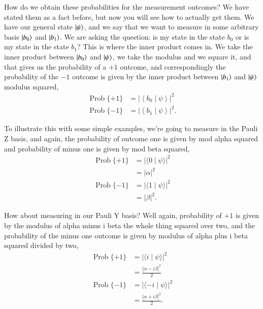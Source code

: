 How do we obtain these probabilities for the measurement outcomes? We have stated them as a fact before, but now you will see how to actually get them. We have our general state $\ket{\psi}$, and we say that we want to measure in some arbitrary basis $\ket{b_0}$ and $\ket{b_1}$. We are asking the question: is my state in the state $b_0$ or is my state in the state $b_1$? This is where the inner product comes in. We take the inner product between $\ket{b_0}$ and $\ket{\psi}$, we take the modulus and we square it, and that gives us the probability of a $+1$ outcome, and correspondingly the probability of the $-1$ outcome is given by the inner product between $\ket{b_1}$ and $\ket{\psi}$ modulus squared,
\begin{equation}
\begin{aligned}
\operatorname{Prob}\{+1\}&=\left|\left\langle b_{0}\mid \psi\right\rangle\right|^{2} \\
\operatorname{Prob}\{-1\}&=\left|\left\langle b_{1}\mid \psi\right\rangle\right|^{2}.
\end{aligned}
\end{equation}

To illustrate this with some simple examples, we're going to measure in the Pauli Z basis, and again, the probability of outcome one is given by mod alpha squared and probability of minus one is given by mod beta squared,
\begin{equation}
\begin{aligned}
\operatorname{Prob}\{+1\} &=|\langle 0 \mid \psi\rangle|^2 \\
&=|\alpha|^2 \\
\operatorname{Prob}\{-1\} &=|\langle 1 \mid \psi\rangle|^2 \\
&=|\beta|^2.
\end{aligned}
\end{equation}

How about measuring in our Pauli Y basis? Well again, probability of $+1$ is given by the modulus of alpha minus i beta the whole thing squared over two, and the probability of the minus one outcome is given by modulus of alpha plus i beta squared divided by two,
\begin{equation}
\begin{aligned}
\operatorname{Prob}\{+1\} &=|\langle i \mid \psi\rangle|^2 \\
&=\frac{|\alpha-i \beta|^2}{2} \\
\operatorname{Prob}\{-1\} &=|\langle-i \mid \psi\rangle|^2 \\
&=\frac{|\alpha+i \beta|^2}{2}.
\end{aligned}
\end{equation}

